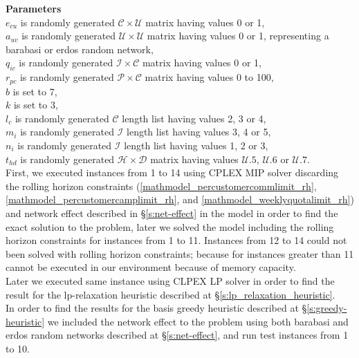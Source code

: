 \documentclass[11pt]{article}
\begin{document}
\noindent \textbf{Parameters}\\

\noindent $e_{{c}{u}}$ is randomly generated $\mathcal{C} \times \mathcal{U}$ matrix having values 0 or 1,\\
\noindent $a_{{u}{v}}$ is randomly generated $\mathcal{U} \times \mathcal{U}$ matrix having values 0 or 1, representing a barabasi or erdos random network,\\
\noindent $q_{{i}{c}}$ is randomly generated $\mathcal{I} \times \mathcal{C}$ matrix having values 0 or 1,\\
\noindent $r_{{p}{c}}$ is randomly generated $\mathcal{P} \times \mathcal{C}$ matrix having values 0 to 100,\\
\noindent $b$ is set to 7,\\
\noindent $k$ is set to 3,\\
\noindent $l_c$ is randomly generated $\mathcal{C}$ length list having values 2, 3 or 4,\\
\noindent $m_i$ is randomly generated $\mathcal{I}$ length list having values 3, 4 or 5,\\
\noindent $n_i$ is randomly generated $\mathcal{I}$ length list having values 1, 2 or 3,\\
\noindent $t_{{h}{d}}$ is randomly generated $\mathcal{H} \times \mathcal{D}$ matrix having values $\mathcal{U}.5$, $\mathcal{U}.6$ or $\mathcal{U}.7$.\\

First, we executed instances from 1 to 14 using CPLEX MIP solver discarding the rolling horizon constraints (\ref{mathmodel_percustomercommlimit_rh}, \ref{mathmodel_percustomercamplimit_rh},  and \ref{mathmodel_weeklyquotalimit_rh}) and network effect described in \S \ref{s:net-effect} in the model in order to find the exact solution to the problem, later we solved the model including the rolling horizon constraints for instances from 1 to 11. Instances from 12 to 14 could not been solved with rolling horizon constraints; because for instances greater than 11 cannot be executed in our environment because of memory capacity.\\
Later we executed same instance using CLPEX LP solver in order to find the result for the lp-relaxation heuristic described at \S \ref{s:lp_relaxation_heuristic}.\\
In order to find the results for the basis greedy heuristic described at \S \ref{s:greedy-heuristic} we included the network effect to the problem using both barabasi and erdos random networks described at \S \ref{s:net-effect}, and run test instances from 1 to 10.
\end{document}
